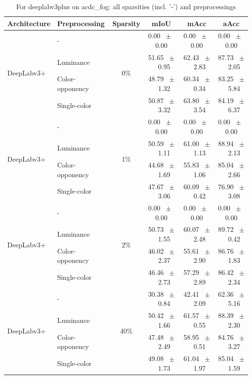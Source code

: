 \begin{table}[h]
  \centering
  \caption{For deeplabv3plus on acdc_fog: all sparsities (incl. '-') and preprocessings}
  \begin{tabular}{@{}l l c c c c@{}}
    \toprule
    Architecture & Preprocessing & Sparsity & mIoU & mAcc & aAcc \\
    \midrule
    \multirow{4}{*}{DeepLabv3+} & - & \multirow{4}{*}{0\%} & 0.00 ~$\pm$~ 0.00 & 0.00 ~$\pm$~ 0.00 & 0.00 ~$\pm$~ 0.00 \\
    & Luminance &  & 51.65 ~$\pm$~ 0.95 & 62.43 ~$\pm$~ 2.83 & 87.73 ~$\pm$~ 2.05 \\
    & Color-opponency &  & 48.79 ~$\pm$~ 1.32 & 60.34 ~$\pm$~ 0.34 & 83.25 ~$\pm$~ 5.84 \\
    & Single-color &  & 50.87 ~$\pm$~ 3.32 & 63.80 ~$\pm$~ 3.54 & 84.19 ~$\pm$~ 6.37 \\
    \midrule
    \multirow{4}{*}{DeepLabv3+} & - & \multirow{4}{*}{1\%} & 0.00 ~$\pm$~ 0.00 & 0.00 ~$\pm$~ 0.00 & 0.00 ~$\pm$~ 0.00 \\
    & Luminance &  & 50.59 ~$\pm$~ 1.11 & 61.00 ~$\pm$~ 1.13 & 88.94 ~$\pm$~ 2.13 \\
    & Color-opponency &  & 44.68 ~$\pm$~ 1.69 & 55.83 ~$\pm$~ 1.06 & 85.04 ~$\pm$~ 2.66 \\
    & Single-color &  & 47.67 ~$\pm$~ 3.06 & 60.09 ~$\pm$~ 0.42 & 76.90 ~$\pm$~ 3.08 \\
    \midrule
    \multirow{4}{*}{DeepLabv3+} & - & \multirow{4}{*}{2\%} & 0.00 ~$\pm$~ 0.00 & 0.00 ~$\pm$~ 0.00 & 0.00 ~$\pm$~ 0.00 \\
    & Luminance &  & 50.73 ~$\pm$~ 1.55 & 60.07 ~$\pm$~ 2.48 & 89.72 ~$\pm$~ 0.42 \\
    & Color-opponency &  & 46.02 ~$\pm$~ 2.37 & 55.61 ~$\pm$~ 2.90 & 86.76 ~$\pm$~ 1.83 \\
    & Single-color &  & 46.46 ~$\pm$~ 2.73 & 57.29 ~$\pm$~ 2.89 & 86.42 ~$\pm$~ 2.34 \\
    \midrule
    \multirow{4}{*}{DeepLabv3+} & - & \multirow{4}{*}{40\%} & 30.38 ~$\pm$~ 0.84 & 42.41 ~$\pm$~ 2.09 & 62.36 ~$\pm$~ 5.16 \\
    & Luminance &  & 50.42 ~$\pm$~ 1.66 & 61.57 ~$\pm$~ 0.55 & 88.39 ~$\pm$~ 2.30 \\
    & Color-opponency &  & 47.48 ~$\pm$~ 2.49 & 58.95 ~$\pm$~ 0.51 & 84.76 ~$\pm$~ 3.27 \\
    & Single-color &  & 49.08 ~$\pm$~ 1.73 & 61.04 ~$\pm$~ 1.97 & 85.04 ~$\pm$~ 1.59 \\
    \midrule

\end{tabular}
\end{table}
